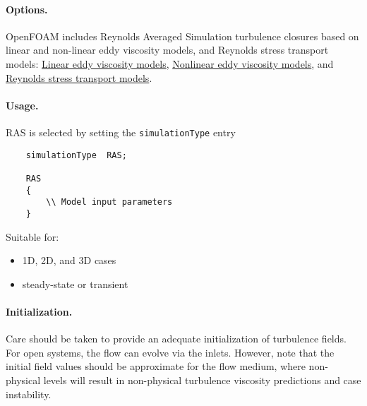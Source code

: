 \documentclass{article}
\numberwithin{equation}{section}
\begin{document}
\paragraph{Options.} OpenFOAM includes Reynolds Averaged Simulation turbulence closures based on linear and non-linear eddy viscosity models, and Reynolds stress transport models: \href{https://www.openfoam.com/documentation/guides/latest/doc/guide-turbulence-ras-linear-eddy-viscosity-models.html}{Linear eddy viscosity models}, \href{https://www.openfoam.com/documentation/guides/latest/doc/guide-turbulence-ras-non-linear-eddy-viscosity-models.html}{Nonlinear eddy viscosity models}, and \href{https://www.openfoam.com/documentation/guides/latest/doc/guide-turbulence-ras-reynolds-stress-transport-models.html}{Reynolds stress transport models}.

\paragraph{Usage.} RAS is selected by setting the \texttt{simulationType} entry 
\begin{verbatim}
	simulationType  RAS;
	
	RAS
	{
        \\ Model input parameters
	}
\end{verbatim}
Suitable for:
\begin{itemize}
	\item 1D, 2D, and 3D cases
	\item steady-state or transient
\end{itemize}

\paragraph{Initialization.} Care should be taken to provide an adequate initialization of turbulence fields. For open systems, the flow can evolve via the inlets. However, note that the initial field values should be approximate for the flow medium, where non-physical levels will result in non-physical turbulence viscosity predictions and case instability.
\end{document}
